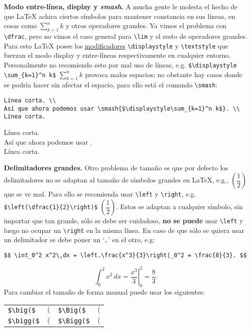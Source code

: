 \textbf{Modo entre-línea, display y \textit{smash}.} A mucha gente le molesta el hecho de que \LaTeX{} achica ciertos símbolos para mantener constancia en sus líneas, en cosas como $\sum_{k=1}^n k$ y otros operadores grandes. Ya vimos el problema con \lstinline|\dfrac|, pero no vimos el caso general para \lstinline|\lim| y el resto de operadores grandes. Para esto \LaTeX{} posee los \underline{modificadores} \lstinline|\displaystyle| y \lstinline|\textstyle| que fuerzan el modo display y entre-líneas respectivamente en cualquier entorno. Personalmente no recomiendo esto por mal uso de líneas, e.g. \lstinline|$\displaystyle \sum_{k=1}^n k$| $\displaystyle \sum_{k=1}^n k$ provoca malos espacios; no obstante hay casos donde se podría hacer sin afectar el espacio, para ello está el comando \lstinline|\smash|:
\begin{lstlisting}[basicstyle=\footnotesize\ttfamily]
Línea corta. \\
Así que ahora podemos usar \smash{$\displaystyle\sum_{k=1}^n k$}. \\
Línea corta.
\end{lstlisting}
Línea corta. \\
Así que ahora podemos usar . \\
Línea corta.

\textbf{Delimitadores grandes.} Otro problema de tamaño es que por defecto los delimitadores no se adaptan al tamaño de símbolos grandes en \LaTeX{}, e.g., $(\dfrac{1}{2})$ que se ve mal. Para ello se recomienda usar \lstinline|\left| y \lstinline|\right|, e.g. \lstinline|$\left(\dfrac{1}{2}\right)$| $\left(\dfrac{1}{2}\right)$. Estos se adaptan a cualquier símbolo, sin importar que tan grande, sólo se debe ser cuidadoso, \textbf{no se puede} usar \lstinline|\left| y luego no ocupar un \lstinline|\right| en la misma línea. En caso de que sólo se quiera usar un delimitador se debe poner un `\texttt{.}' en el otro, e.g:
\begin{lstlisting}
$$ \int_0^2 x^2\,dx = \left.\frac{x^3}{3}\right|_0^2 = \frac{8}{3}. $$
\end{lstlisting}
$$ \int_0^2 x^2\,dx = \left.\frac{x^3}{3}\right|_0^2 = \frac{8}{3}. $$
Para cambiar el tamaño de forma manual puede usar los siguientes:
\begin{center}
	\begin{tabular}{ll|ll}
		\hline \hline
		\lstinline|$\big($|  & $\big($  & \lstinline|$\Big($|  & $\Big($ \\
		\lstinline|$\bigg($| & $\bigg($ & \lstinline|$\Bigg($| & $\Bigg($ \\
		\hline \hline
	\end{tabular}
\end{center}

